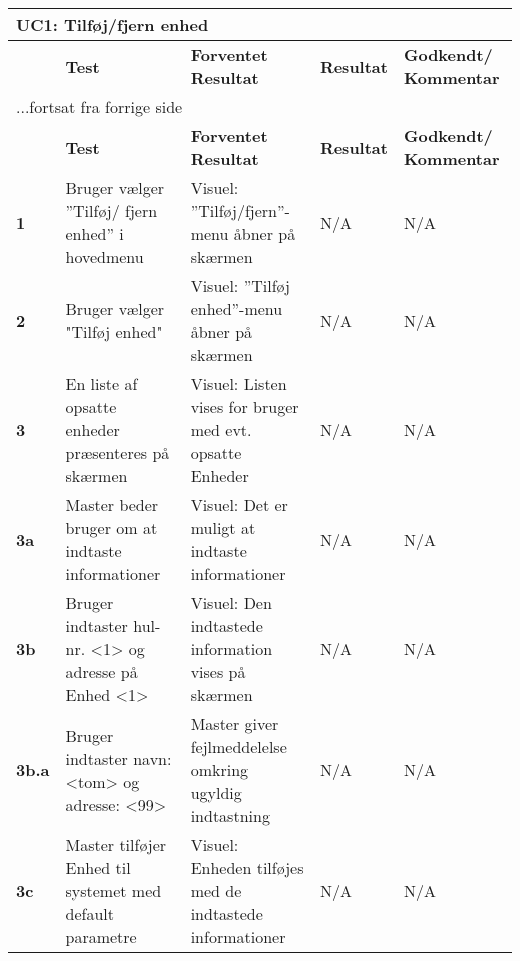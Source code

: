 \begin{center}
\begin{longtable}{|p{}|p{}|p{}|p{}|p{}|} %
\hline
\multicolumn{5}{|l|}{\textbf{UC1: Tilføj/fjern enhed}} \\ \hline
\multicolumn{1}{|c|}{} &
\textbf{Test} &
\textbf{Forventet \newline Resultat} &
\textbf{Resultat} &
\textbf{Godkendt/ \newline Kommentar} \\ \hline 
\endfirsthead

\multicolumn{5}{l}{...fortsat fra forrige side} \\ \hline 
\multicolumn{1}{|c|}{} &
\textbf{Test} &
\textbf{Forventet \newline Resultat} &
\textbf{Resultat} &
\textbf{Godkendt/ \newline Kommentar} \\ \hline 
\endhead


\textbf{1}	&Bruger vælger ''Tilføj/ fjern enhed'' i hovedmenu 
			&Visuel: ''Tilføj/fjern''-menu åbner på skærmen 
			&N/A 
			&N/A \\\hline
			 
\textbf{2}	&Bruger vælger "Tilføj enhed" 
			&Visuel: ''Tilføj enhed''-menu åbner på skærmen  
			&N/A 
			&N/A \\\hline
			 
\textbf{3}	&En liste af opsatte enheder præsenteres på skærmen
			&Visuel: Listen vises for bruger med evt. opsatte Enheder
			&N/A 
			&N/A \\\hline
			 
\textbf{3a}	&Master beder bruger om at indtaste informationer
			&Visuel: Det er muligt at indtaste informationer
			&N/A
			&N/A \\\hline 
			
\textbf{3b}&Bruger indtaster hul-nr. <1> og adresse på Enhed <1>
			&Visuel: Den indtastede information vises på skærmen 
			&N/A 
			&N/A \\\hline
			 
\textbf{3b.a}&Bruger indtaster navn: <tom> og adresse: <99>
			&Master giver fejlmeddelelse omkring ugyldig indtastning
			&N/A 
			&N/A \\\hline
						 
\textbf{3c}&Master tilføjer Enhed til systemet med default parametre
			&Visuel: Enheden tilføjes med de indtastede informationer
			&N/A 
			&N/A \\\hline
			 

\end{longtable}
\end{center}
